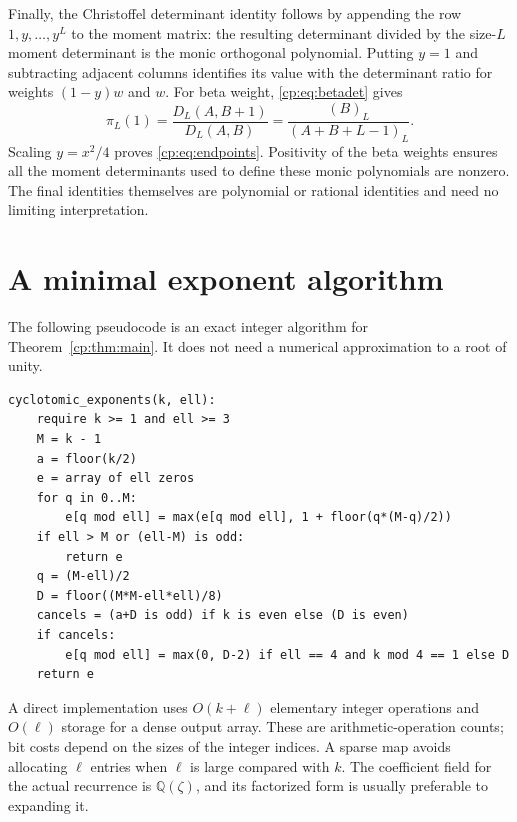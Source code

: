 \documentclass[11pt]{article}
\theoremstyle{definition}
\theoremstyle{remark}
\newcommand{\Q}{\mathbb Q}
\newcommand{\rise}[2]{(#1)_{#2}}
\theoremstyle{definition}
\theoremstyle{plain}
\numberwithin{equation}{section}
\begin{document}
Finally, the Christoffel determinant identity follows by appending the row
$1,y,\ldots,y^L$ to the moment matrix: the resulting determinant divided
by the size-$L$ moment determinant is the monic orthogonal polynomial.
Putting $y=1$ and subtracting adjacent columns identifies its value with
the determinant ratio for weights $(1-y)w$ and $w$.
For beta weight, \eqref{cp:eq:betadet} gives
\begin{equation}
 \pi_L(1)=\frac{D_L(A,B+1)}{D_L(A,B)}
         =\frac{\rise BL}{\rise{A+B+L-1}L}.
 \label{cp:eq:betaendpoint}
\end{equation}
Scaling $y=x^2/4$ proves \eqref{cp:eq:endpoints}. Positivity of the beta
weights ensures all the moment determinants used to define these monic
polynomials are nonzero. The final identities themselves are polynomial
or rational identities and need no limiting interpretation.

\section{A minimal exponent algorithm}
\label{cp:app:algorithm}
The following pseudocode is an exact integer algorithm for
Theorem~\ref{cp:thm:main}. It does not need a numerical approximation to a
root of unity.
\begin{verbatim}
cyclotomic_exponents(k, ell):
    require k >= 1 and ell >= 3
    M = k - 1
    a = floor(k/2)
    e = array of ell zeros
    for q in 0..M:
        e[q mod ell] = max(e[q mod ell], 1 + floor(q*(M-q)/2))
    if ell > M or (ell-M) is odd:
        return e
    q = (M-ell)/2
    D = floor((M*M-ell*ell)/8)
    cancels = (a+D is odd) if k is even else (D is even)
    if cancels:
        e[q mod ell] = max(0, D-2) if ell == 4 and k mod 4 == 1 else D
    return e
\end{verbatim}
A direct implementation uses $O(k+\ell)$ elementary integer operations
and $O(\ell)$ storage for a dense output array. These are arithmetic-operation
counts; bit costs depend on the sizes of the integer indices. A sparse map
avoids allocating $\ell$ entries when $\ell$ is large compared with $k$.
The coefficient field for the actual recurrence is $\Q(\zeta)$, and
its factorized form is usually preferable to expanding it.
\end{document}
